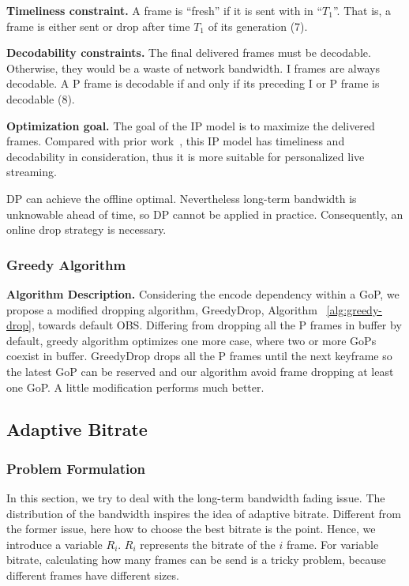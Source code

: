 \textbf{Timeliness constraint.}
A frame is ``fresh'' if it is sent with in ``$T_1$''. That is, a frame is either sent or drop after time $T_1$ of its generation (7).

\textbf{Decodability constraints.} The final delivered frames must be decodable. Otherwise, they would be a waste of network bandwidth. I frames are always decodable. A P frame is decodable if and only if its preceding I or P frame is decodable (8).

\textbf{Optimization goal.} The goal of the IP model is to maximize the delivered frames.
Compared with prior work~\cite{singh2004dynamic}, this IP model has timeliness and decodability in consideration, thus it is more suitable for personalized live streaming.

DP can achieve the offline optimal. Nevertheless long-term bandwidth is unknowable ahead of time, so DP cannot be applied in practice. Consequently, an online drop strategy is necessary.

\subsubsection{Greedy Algorithm}

\textbf{Algorithm Description.} Considering the encode dependency within a GoP, we propose a modified dropping algorithm, GreedyDrop, Algorithm ~\ref{alg:greedy-drop}, towards default OBS. Differing from dropping all the P frames in buffer by default, greedy algorithm optimizes one more case, where two or more GoPs coexist in buffer. GreedyDrop drops all the P frames until the next keyframe so the latest GoP can be reserved and our algorithm avoid frame dropping at least one GoP. A little modification performs much better.

\subsection{Adaptive Bitrate}
\label{subsec:adaptive-bitrate}
\subsubsection{Problem Formulation}


In this section, we try to deal with the long-term bandwidth fading issue. The distribution of the bandwidth inspires the idea of adaptive bitrate. Different from the former issue, here how to choose the best bitrate is the point. Hence, we introduce a variable $R_{i}$. $R_{i}$ represents the bitrate of the $i$ frame. For variable bitrate, calculating how many frames can be send is a tricky problem, because different frames have different sizes.

